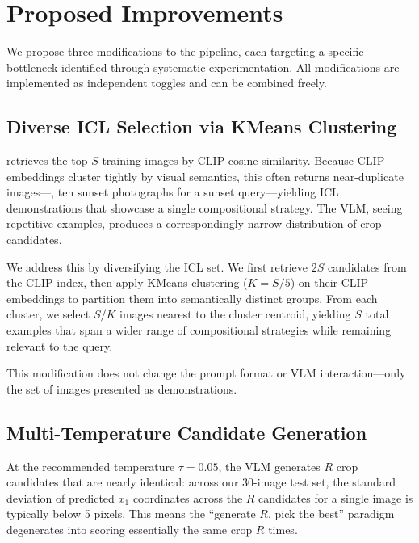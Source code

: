\section{Proposed Improvements}
\label{sec:method}

We propose three modifications to the \baseline pipeline, each targeting
a specific bottleneck identified through systematic experimentation.
All modifications are implemented as independent toggles and can be
combined freely.

\subsection{Diverse ICL Selection via KMeans Clustering}
\label{sec:diverse_icl}

\baseline retrieves the top-$S$ training images by CLIP cosine
similarity.  Because CLIP embeddings cluster tightly by visual
semantics, this often returns near-duplicate images---\eg, ten sunset
photographs for a sunset query---yielding ICL demonstrations that
showcase a single compositional strategy.  The VLM, seeing repetitive
examples, produces a correspondingly narrow distribution of crop
candidates.

We address this by diversifying the ICL set.  We first retrieve $2S$
candidates from the CLIP index, then apply KMeans clustering
($K = S/5$) on their CLIP embeddings to partition them into
semantically distinct groups.  From each cluster, we select
$S/K$ images nearest to the cluster centroid, yielding $S$ total
examples that span a wider range of compositional strategies while
remaining relevant to the query.

This modification does not change the prompt format or VLM
interaction---only the set of images presented as demonstrations.

\subsection{Multi-Temperature Candidate Generation}
\label{sec:multitemp}

At the recommended temperature $\tau = 0.05$, the VLM generates $R$
crop candidates that are nearly identical: across our 30-image test
set, the standard deviation of predicted $x_1$ coordinates across the
$R$ candidates for a single image is typically below 5 pixels.  This
means the ``generate $R$, pick the best'' paradigm degenerates into
scoring essentially the same crop $R$ times.

